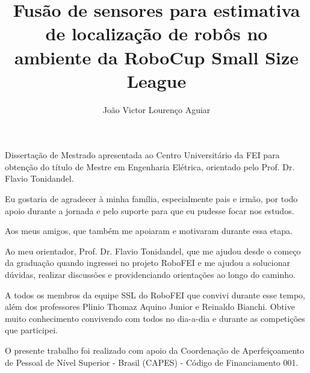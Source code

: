 \documentclass[acronym, symbols, table, deposito]{fei}
\title{Fusão de sensores para estimativa de localização de robôs no ambiente da RoboCup Small Size League}
\author{João Victor Lourenço Aguiar}
\begin{document}
	
\maketitle

\begin{folhaderosto}
	Dissertação de Mestrado apresentada ao Centro Universitário da FEI para obtenção do título de Mestre em Engenharia Elétrica, orientado pelo Prof. Dr. Flavio Tonidandel.
\end{folhaderosto}

\fichacatalografica

\folhadeaprovacao

\begin{agradecimentos}
	Eu gostaria de agradecer à minha família, especialmente pais e irmão, por todo apoio durante a jornada e pelo suporte para que eu pudesse focar nos estudos.
	
	Aos meus amigos, que também me apoiaram e motivaram durante essa etapa.
	
	Ao meu orientador, Prof. Dr. Flavio Tonidandel, que me ajudou desde o começo da graduação quando ingressei no projeto RoboFEI e me ajudou a solucionar dúvidas, realizar discussões e providenciando orientações ao longo do caminho.
	
	A todos os membros da equipe SSL do RoboFEI que convivi durante esse tempo, além dos professores Plinio Thomaz Aquino Junior e Reinaldo Bianchi. Obtive muito conhecimento convivendo com todos no dia-a-dia e durante as competições que participei.
	
	O presente trabalho foi realizado com apoio da Coordenação de Aperfeiçoamento de Pessoal de Nível Superior - Brasil (CAPES) - Código de Financiamento 001.
\end{agradecimentos}

\begin{epigrafe}
\end{epigrafe}
	
\end{document}
